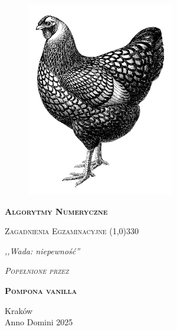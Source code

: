 \begin{titlepage} 
    \begin{center}
         \begin{figure}[h]
            \centering
            \includegraphics[]{img/kura.png}
           
        \end{figure}
        
        \Huge
        \textbf{\textsc{Algorytmy Numeryczne}}
        
        \vspace{0.5cm}
        \Large
        \textsc{Zagadnienia Egzaminacyjne}
        \line(1,0){330}
        
        \normalsize
        
        \vspace{1cm}
        \textit{,,Wada: niepewność''}
        \vspace{1cm}

        \textit{\textsc{Popełnione przez}}\\
        \vspace{5mm}
  
        \textbf{\textsc{Pompona vanilla}}
 
        \vfill

        Kraków \\
        Anno Domini 2025
    \end{center}
\end{titlepage}
